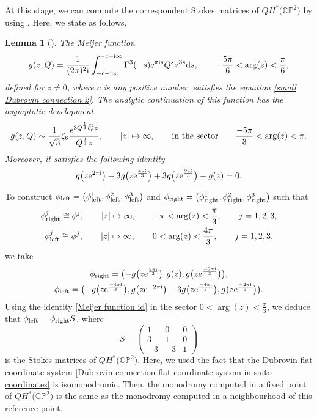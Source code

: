 \documentclass[pdftex]{sigma}
\numberwithin{equation}{section}
\newtheorem{Lemma}[Theorem]{Lemma}
\begin{document}
At this stage, we can compute the correspondent Stokes matrices of $QH^{*}\bigl(\mathbb{CP}^2\bigr)$ by using \cite[Lemma~4.9]{B.Dubrovin3}. Here, we state as follows.

\begin{Lemma}[{\cite{B.Dubrovin3}}]
The Meijer function
\[%
g(z,Q)=\frac{1}{(2\pi)^2{\rm i}}\int_{-c-{\rm i}\infty}^{-c+{\rm i}\infty} \Gamma^3(-s){\rm e}^{\pi {\rm i}s }Q^sz^{3s}{\rm d}s, \qquad -\frac{5\pi}{6}<\arg(z)<\frac{\pi}{6},
\]
defined for $z\neq 0$, where $c$ is any positive number, satisfies the equation \eqref{small Dubrovin connection 2}. The analytic continuation of this function has the asymptotic development
\[
g(z,Q)\sim \frac{1}{\sqrt{3}}\bar\zeta_6\frac{{\rm e}^{3Q^{\frac{1}{3}}\bar\zeta_6^2z}}{Q^{\frac{1}{3}}z}, \qquad |z|\mapsto \infty, \qquad \text{in the sector} \qquad \frac{-5\pi}{3}<\arg(z)<\pi.
\]
Moreover, it satisfies the following identity
\begin{gather}\label{Meijer function id}
g\bigl(z{\rm e}^{2\pi {\rm i}}\bigr)-3g\bigl(z{\rm e}^{\frac{4\pi {\rm i}}{3}}\bigr)+3g\bigl(z{\rm e}^{\frac{2\pi {\rm i}}{3}}\bigr)-g(z)=0.
\end{gather}

\end{Lemma}


To construct $\phi_{\rm left}=\bigl(\phi_{\rm left}^1,\phi_{\rm left}^2,\phi_{\rm left}^3\bigr)$ and $\phi_{\rm right}=\bigl(\phi_{\rm right}^1,\phi_{\rm right}^2,\phi_{\rm right}^3\bigr)$ such that
\begin{gather*}
\phi_{\rm right}^j\cong\phi^j, \qquad |z|\mapsto \infty, \qquad -\pi<\arg(z)<\frac{\pi}{3}, \qquad j=1,2,3,\\
\phi_{\rm left}^j\cong\phi^j, \qquad |z|\mapsto \infty, \qquad 0<\arg(z)<\frac{4\pi}{3}, \qquad j=1,2,3,
\end{gather*}
we take
\begin{gather*}
\phi_{\rm right}=\bigl(-g\bigl(z{\rm e}^{\frac{2\pi {\rm i}}{3}}\bigr),g(z),g\bigl(z{\rm e}^{\frac{-2\pi {\rm i}}{3}}\bigr) \bigr),\\
\phi_{\rm left}=\bigl(-g\bigl(z{\rm e}^{\frac{-4\pi {\rm i}}{3}}\bigr),g\bigl(z{\rm e}^{-2\pi {\rm i}}\bigr)-3g\bigl(z{\rm e}^{\frac{-4\pi {\rm i}}{3}}\bigr),g\bigl(z{\rm e}^{\frac{-2\pi {\rm i}}{3}}\bigr) \bigr).
\end{gather*}
Using the identity \eqref{Meijer function id} in the sector $0<\arg(z)<\frac{\pi}{3}$, we deduce that
$\phi_{\rm left}=\phi_{\rm right}S$,
where
\[
S={\begin{pmatrix}
1& 0&0 \\
3& 1& 0\\
-3& -3 & 1
\end{pmatrix}}
\]
is the Stokes matrices of $QH^{*}\bigl(\mathbb{CP}^2\bigr)$. Here, we used the fact that the Dubrovin flat coordinate system \eqref{Dubrovin connection flat coordinate system in saito coordinates} is isomonodromic. Then, the monodromy computed in a fixed point of $QH^{*}\bigl(\mathbb{CP}^2\bigr)$ is the same as the monodromy computed in a neighbourhood of this reference point.
\end{document}
